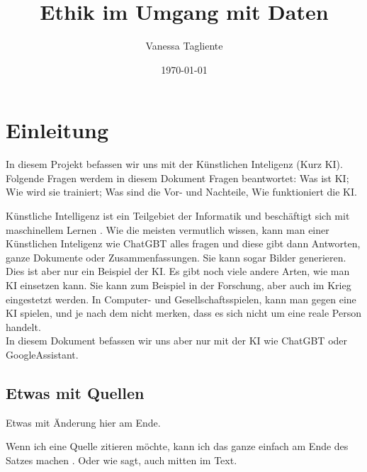 \documentclass{report}
\title{Ethik im Umgang mit Daten}
\author{Vanessa Tagliente}
\date{\today}
\begin{document}
\maketitle


\tableofcontents

\chapter{Einleitung}

In diesem Projekt befassen wir uns mit der Künstlichen Inteligenz (Kurz KI).
Folgende Fragen werdem in diesem Dokument Fragen beantwortet: Was ist KI; Wie wird sie trainiert; Was sind die Vor- und Nachteile, Wie funktioniert die KI.

\bigskip
Künstliche Intelligenz ist ein Teilgebiet der Informatik und beschäftigt sich mit maschinellem Lernen \citep{ai-wikipedia}.
Wie die meisten vermutlich wissen, kann man einer Künstlichen Inteligenz wie ChatGBT alles fragen und diese gibt dann Antworten, ganze Dokumente oder Zusammenfassungen. Sie kann sogar Bilder generieren.
Dies ist aber nur ein Beispiel der KI. Es gibt noch viele andere Arten, wie man KI einsetzen kann. Sie kann zum Beispiel in der Forschung, aber auch im Krieg eingestetzt werden. In Computer- und Gesellschaftsspielen, kann man gegen eine KI spielen, und je nach dem nicht merken, dass es sich nicht um eine reale Person handelt.\\
In diesem Dokument befassen wir uns aber nur mit der KI wie ChatGBT oder GoogleAssistant.









\section{Etwas mit Quellen}

Etwas mit Änderung hier am Ende.

Wenn ich eine Quelle zitieren möchte, kann ich das ganze einfach am Ende des Satzes machen \citep{example}. Oder wie \citet{example} sagt, auch mitten im Text.

\printbibliography
\end{document}
